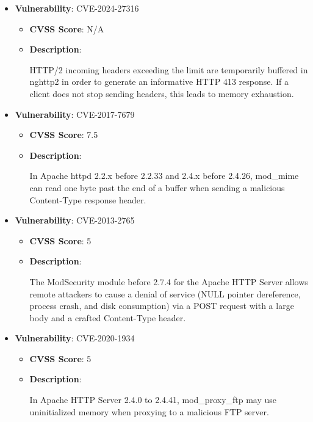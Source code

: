 \documentclass{article}
\begin{document}
\begin{itemize}
        \item \textbf{Vulnerability}: CVE-2024-27316
        \begin{itemize}
            \item \textbf{CVSS Score}:  N/A 
            \item \textbf{Description}:
            \parbox[t]{0.9\linewidth}{
                \ttfamily HTTP/2 incoming headers exceeding the limit are temporarily buffered in nghttp2 in order to generate an informative HTTP 413 response. If a client does not stop sending headers, this leads to memory exhaustion.
            }
        \end{itemize}
    
        \item \textbf{Vulnerability}: CVE-2017-7679
        \begin{itemize}
            \item \textbf{CVSS Score}:  7.5 
            \item \textbf{Description}:
            \parbox[t]{0.9\linewidth}{
                \ttfamily In Apache httpd 2.2.x before 2.2.33 and 2.4.x before 2.4.26, mod\_mime can read one byte past the end of a buffer when sending a malicious Content-Type response header.
            }
        \end{itemize}
    
        \item \textbf{Vulnerability}: CVE-2013-2765
        \begin{itemize}
            \item \textbf{CVSS Score}:  5 
            \item \textbf{Description}:
            \parbox[t]{0.9\linewidth}{
                \ttfamily The ModSecurity module before 2.7.4 for the Apache HTTP Server allows remote attackers to cause a denial of service (NULL pointer dereference, process crash, and disk consumption) via a POST request with a large body and a crafted Content-Type header.
            }
        \end{itemize}
    
        \item \textbf{Vulnerability}: CVE-2020-1934
        \begin{itemize}
            \item \textbf{CVSS Score}:  5 
            \item \textbf{Description}:
            \parbox[t]{0.9\linewidth}{
                \ttfamily In Apache HTTP Server 2.4.0 to 2.4.41, mod\_proxy\_ftp may use uninitialized memory when proxying to a malicious FTP server.
            }
        \end{itemize}
    

\end{itemize}
\end{document}
